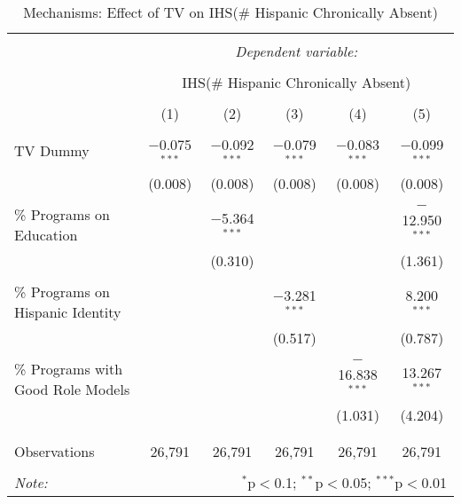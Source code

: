 
\begin{table}[!htbp] \centering 
  \caption{Mechanisms: Effect of TV on IHS(\# Hispanic Chronically Absent)} 
  \label{} 
\begin{tabular}{@{\extracolsep{-2pt}}lccccc} 
\\[-1.8ex]\hline 
\hline \\[-1.8ex] 
 & \multicolumn{5}{c}{\textit{Dependent variable:}} \\ 
\cline{2-6} 
\\[-1.8ex] & \multicolumn{5}{c}{IHS(\# Hispanic Chronically Absent)} \\ 
\\[-1.8ex] & (1) & (2) & (3) & (4) & (5)\\ 
\hline \\[-1.8ex] 
 TV Dummy & $-$0.075$^{***}$ & $-$0.092$^{***}$ & $-$0.079$^{***}$ & $-$0.083$^{***}$ & $-$0.099$^{***}$ \\ 
  & (0.008) & (0.008) & (0.008) & (0.008) & (0.008) \\ 
  & & & & & \\ 
 \% Programs on Education &  & $-$5.364$^{***}$ &  &  & $-$12.950$^{***}$ \\ 
  &  & (0.310) &  &  & (1.361) \\ 
  & & & & & \\ 
 \% Programs on Hispanic Identity &  &  & $-$3.281$^{***}$ &  & 8.200$^{***}$ \\ 
  &  &  & (0.517) &  & (0.787) \\ 
  & & & & & \\ 
 \% Programs with Good Role Models &  &  &  & $-$16.838$^{***}$ & 13.267$^{***}$ \\ 
  &  &  &  & (1.031) & (4.204) \\ 
  & & & & & \\ 
\hline \\[-1.8ex] 
Observations & 26,791 & 26,791 & 26,791 & 26,791 & 26,791 \\ 
\hline 
\hline \\[-1.8ex] 
\textit{Note:}  & \multicolumn{5}{r}{$^{*}$p$<$0.1; $^{**}$p$<$0.05; $^{***}$p$<$0.01} \\ 
\end{tabular} 
\end{table} 

